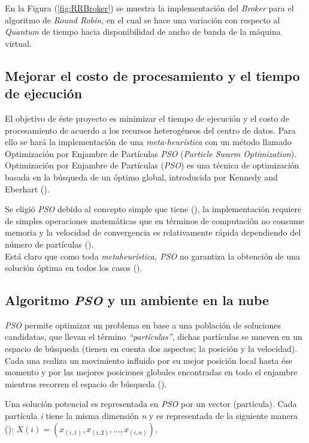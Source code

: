 En la Figura (\ref{fig:RRBroker}) se muestra la implementación del \textit{Broker} para el algoritmo de \textit{Round Robin}, en el cual se hace una variación con respecto al \textit{Quantum} de tiempo hacia disponibilidad de ancho de banda de la máquina virtual.


\subsection{Mejorar el costo de procesamiento y el tiempo de ejecución}

El objetivo de éste proyecto es minimizar el tiempo de ejecución y el costo de procesamiento de acuerdo a los recursos heterogéneos del centro de datos. Para ello se hará la  implementación de una \textit{meta-heurística} con un método llamado Optimización por Enjambre de Partículas \textit{PSO} (\textit{Particle Swarm Optimization}).\\

Optimización por Enjambre de Partículas (\textit{PSO}) es una técnica de optimización basada en la búsqueda de un óptimo global, introducida por Kennedy and Eberhart (\cite{pandey2010}). 

Se eligió  \textit{PSO} debido al concepto simple que tiene (\cite{poli2007}),  la implementación requiere de simples operaciones matemáticas que en términos de computación no consume memoria  y la velocidad de convergencia es relativamente rápida dependiendo del número de partículas (\cite{eberhart1995}).\\ 
Está claro que como toda \textit{metaheurística, PSO} no garantiza la obtención de una solución óptima en todos los casos (\cite{osman2012}).

\subsection*{Algoritmo \textit{PSO} y un ambiente en la nube}
\textit{PSO} permite optimizar un problema en base a una población de soluciones candidatas, que llevan el término \textit{“partículas”}, dichas partículas se mueven en un espacio de búsqueda (tienen en cuenta dos aspectos; la posición y la velocidad). Cada una realiza un movimiento influido por su mejor posición local hasta ése momento y por las mejores posiciones globales encontradas en todo el enjambre mientras recorren el espacio de búsqueda (\cite{poli2007}).

Una solución potencial es representada en \textit{PSO} por un vector (partícula). Cada partícula \textit{i} tiene la misma dimensión \textit{n} y es representada de la siguiente manera (\cite{pandey2010}): $X(i) = (x_{(i,1)},x_{(i,2)},...,x_{(i,n)})  $.

